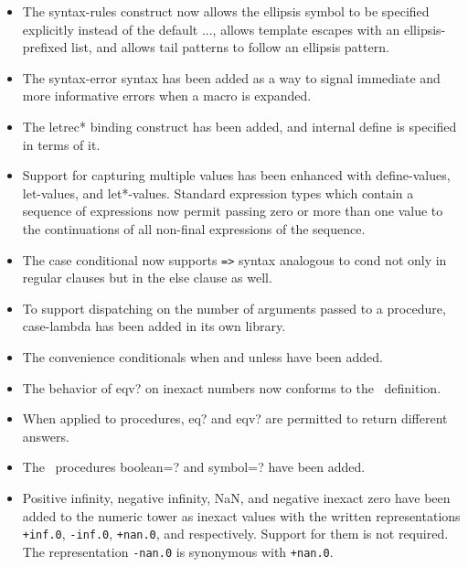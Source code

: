\begin{itemize}
\item The {\cf syntax-rules} construct now allows
the ellipsis symbol to be specified explicitly instead of the default
{\cf ...}, allows template escapes with an ellipsis-prefixed list, and
allows tail patterns to follow an ellipsis pattern.

\item The {\cf syntax-error} syntax has been added as a way to signal immediate
and more informative errors when a macro is expanded.

\item The {\cf letrec*} binding construct has been added, and internal {\cf define} 
is specified in terms of it.

\item Support for capturing multiple values has been enhanced with {\cf
define-values}, {\cf let-values}, and {\cf let*-values}.
Standard expression types which contain a sequence of expressions now
permit passing zero or more than one value to the continuations of all
non-final expressions of the sequence.

\item The {\cf case} conditional now supports {\tt =>} syntax
analogous to {\cf cond} not only in regular clauses but in the {\cf
else} clause as well.

\item To support dispatching on the number of arguments passed to a
procedure, {\cf case-lambda} has been added in its own library.

\item The convenience conditionals {\cf when} and {\cf unless} have been added.

\item The behavior of {\cf eqv?} on inexact numbers now conforms to the
\rsixrs\ definition.

\item When applied to procedures, {\cf eq?} and {\cf eqv?} are permitted to
return different answers.

\item The \rsixrs\ procedures {\cf boolean=?} and {\cf symbol=?} have been added.

\item Positive infinity, negative infinity, NaN, and negative inexact zero have been added
to the numeric tower as inexact values with the written
representations {\tt +inf.0}, {\tt -inf.0}, {\tt +nan.0}, and {}
respectively.  Support for them is not required.
The representation {\tt -nan.0} is synonymous with {\tt +nan.0}.


\end{itemize}
